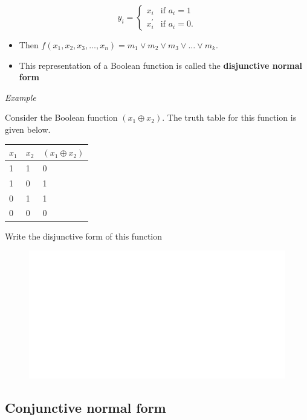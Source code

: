 \documentclass[]{book}
\providecommand{\tightlist}{%
  \setlength{\itemsep}{0pt}\setlength{\parskip}{0pt}}
\begin{document}
\begin{equation}
y_i =
\begin{cases} 
x_i & \text{if } a_i=1\\
x_i^\prime & \text{if } a_i=0.
\end{cases}
\end{equation}

\begin{itemize}
\tightlist
\item
  Then \(f(x_1, x_2, x_3, \dots, x_n)= m_1 \lor m_2 \lor m_3 \lor \dots \lor m_k.\)
\item
  This representation of a Boolean function is called the \textbf{disjunctive normal form}
\end{itemize}

\emph{Example}

Consider the Boolean function \((x_1 \oplus x_2).\) The truth table for this function is given below.

\begin{longtable}[]{@{}lll@{}}
\toprule
\(x_1\) & \(x_2\) & \((x_1 \oplus x_2)\)\tabularnewline
\midrule
\endhead
1 & 1 & 0\tabularnewline
1 & 0 & 1\tabularnewline
0 & 1 & 1\tabularnewline
0 & 0 & 0\tabularnewline
\bottomrule
\end{longtable}

Write the disjunctive form of this function

\begin{figure}

{\centering \includegraphics[width=1\linewidth]{figure/boxC416-1} 

}

\end{figure}

\hypertarget{conjunctive-normal-form}{%
\subsection{Conjunctive normal form}\label{conjunctive-normal-form}}
\end{document}
